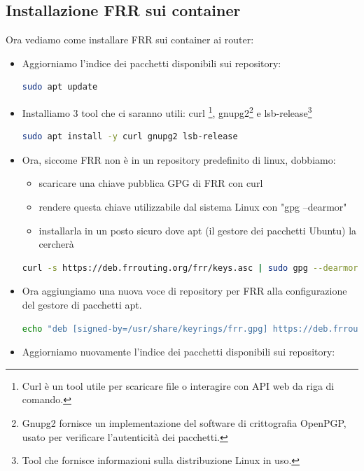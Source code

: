 \documentclass[12pt,a4paper,twoside]{book}
\begin{document}
\subsection{Installazione FRR sui container}
Ora vediamo come installare \ac{FRR} sui container ai router:
\begin{itemize}
    \item Aggiorniamo l'indice dei pacchetti disponibili sui repository:
    \begin{lstlisting}[language=bash]
sudo apt update
    \end{lstlisting}
    \item Installiamo 3 tool che ci saranno utili: curl \footnote{Curl è un tool utile per scaricare file o interagire con API web da riga di comando.}, gnupg2\footnote{Gnupg2 fornisce un implementazione del software di crittografia OpenPGP, usato per verificare l'autenticità dei pacchetti.} e lsb-release\footnote{Tool che fornisce informazioni sulla distribuzione Linux in uso.}
    \begin{lstlisting}[language=bash]
sudo apt install -y curl gnupg2 lsb-release
    \end{lstlisting}
    \item Ora, siccome \ac{FRR} non è in un repository predefinito di linux, dobbiamo:
    \begin{itemize}
        \item scaricare una chiave pubblica GPG di \ac{FRR} con curl
        \item rendere questa chiave utilizzabile dal sistema Linux con "gpg --dearmor"
        \item installarla in un posto sicuro dove apt (il gestore dei pacchetti Ubuntu) la cercherà
    \end{itemize}
       \begin{lstlisting}[language=bash]
curl -s https://deb.frrouting.org/frr/keys.asc | sudo gpg --dearmor -o /usr/share/keyrings/frr.gpg
    \end{lstlisting}
    \item Ora aggiungiamo una nuova voce di repository per \ac{FRR} alla configurazione del gestore di pacchetti apt.
    \begin{lstlisting}[language=bash]
echo "deb [signed-by=/usr/share/keyrings/frr.gpg] https://deb.frrouting.org/frr/ $(lsb_release -cs) frr-stable" | sudo tee /etc/apt/sources.list.d/frr.list
    \end{lstlisting}
    \item Aggiorniamo nuovamente l'indice dei pacchetti disponibili sui repository:

\end{itemize}
\end{document}
